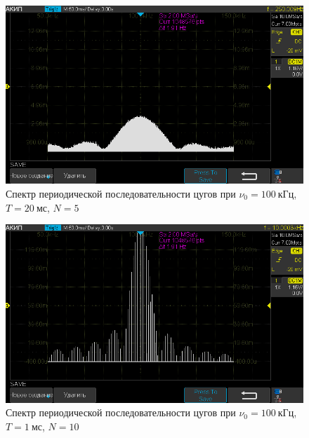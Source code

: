 \documentclass[a4paper, 12pt]{article}
\begin{document}
\begin{figure}[h!]
\begin{flushleft}
    \includegraphics[scale=0.5]{AKIP0011.png}
\end{flushleft}
\caption{Спектр периодической последовательности цугов при $\nu_0 = 100~кГц$, $T = 20~мс$, $N = 5$}
\label{ris17}
\end{figure}

\begin{figure}[h!]
\begin{flushleft}
    \includegraphics[scale=0.5]{AKIP0012.png}
\end{flushleft}
\caption{Спектр периодической последовательности цугов при $\nu_0 = 100~кГц$, $T = 1~мс$, $N = 10$}
\label{ris18}
\end{figure}
\end{document}
